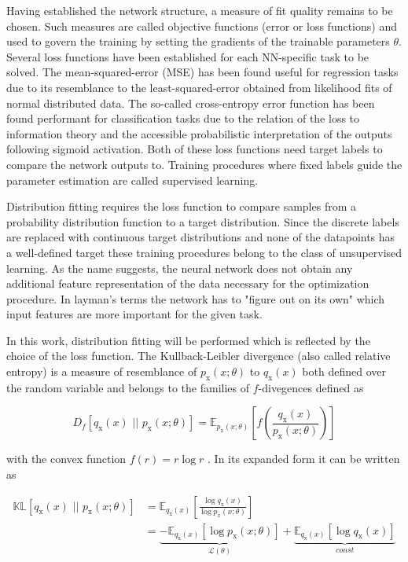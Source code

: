 
Having established the network structure, a measure of fit quality remains to be chosen. Such measures are called objective functions (error or loss functions) and used to govern the training by setting the gradients of the trainable parameters $\theta$.
Several loss functions have been established for each NN-specific task to be solved. The mean-squared-error (MSE) has been found useful for regression tasks due to its resemblance to the least-squared-error obtained from likelihood fits of normal distributed data. The so-called cross-entropy error function has been found performant for classification tasks due to the relation of the loss to information theory and the accessible probabilistic interpretation of the outputs following sigmoid activation. Both of these loss functions need target labels to compare the network outputs to. Training procedures where fixed labels guide the parameter estimation are called supervised learning.

Distribution fitting requires the loss function to compare samples from a probability distribution function to a target distribution. Since the discrete labels are replaced with continuous target distributions and none of the datapoints has a well-defined target these training procedures belong to the class of unsupervised learning. As the name suggests, the neural network does not obtain any additional feature representation of the data necessary for the optimization procedure. In layman's terms the network has to "figure out on its own" which input features are more important for the given task.

In this work, distribution fitting will be performed which is reflected by the choice of the loss function. The Kullback-Leibler divergence (also called relative entropy) is a measure of resemblance of $p_\text{x}(x; \theta)$ to $q_\text{x}(x)$ both defined over the random variable  and belongs to the families of $f$-divegences defined as

\begin{equation*}
	D_f\left[q_\text{x}(x) \, \, || \, \, p_\text{x}(x; \theta)\right] = \mathbb{E}_{p_\text{x}(x; \theta)}\left[f\left(\frac{q_\text{x}(x)}{p_\text{x}(x; \theta)}\right)\right]
\end{equation*}

with the convex function $f(r) = r\log r$ \cite{Papamakarios_NF}. In its expanded form it can be written as

\begin{equation}
	\begin{aligned}
		\mathbb{KL}\left[q_\text{x}(x) \, \, || \, \, p_\text{x}(x; \theta)\right] &= \mathbb{E}_{q_\text{x}(x)}\left[\frac{\log q_\text{x}(x)}{\log p_x(x; \theta)}\right] \\&= \underbrace{- \mathbb{E}_{q_\text{x}(x)} \left[ \log p_\text{x}(x; \theta)\right]}_{\mathcal{L}(\theta)} + \underbrace{\mathbb{E}_{q_\text{x}(x)}\left[\log q_\text{x}(x)\right]}_{const}
	\end{aligned}
	\label{eq:KL-loss}
\end{equation}

